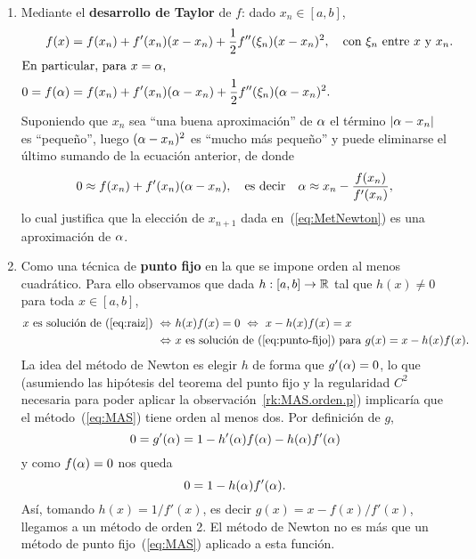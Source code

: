 \begin{enumerate}
\item Mediante el \textbf{desarrollo de Taylor} de $f$: dado $x_n\in [a,b]$,
  \begin{align*}
    f(x)&=f(x_n) + f'(x_n)(x-x_n) + \frac 12 f''(\xi_n)(x-x_n)^2, \quad
          \text{con $\xi_n$ entre $x$ y $x_n$}.
    \\
    \intertext{En particular, para $x=\alpha$,}
    0=f(\alpha)&=f(x_n) + f'(x_n)(\alpha-x_n) + \frac 12 f''(\xi_n)(\alpha-x_n)^2.
  \end{align*}
  Suponiendo que $x_n$ sea ``una buena aproximación'' de $\alpha$ el
  término $|\alpha-x_n|$ es ``pequeño'', luego $(\alpha-x_n)^2$ es
  ``mucho más pequeño'' y puede eliminarse el último sumando de la
  ecuación anterior, de donde
  \begin{equation*}
    0 \approx f(x_n) + f'(x_n)(\alpha-x_n), \quad \text{es decir} \quad
    \alpha \approx x_n - \frac{f(x_n)}{f'(x_n)},
  \end{equation*}
  lo cual justifica que la elección de $x_{n+1}$ dada
  en~(\ref{eq:MetNewton}) es una aproximación de $\alpha$.
\item Como una técnica de \textbf{punto fijo} en la que se impone
  orden al menos cuadrático. %
  Para ello observamos que dada $h:[a,b]\to\operatorname{{\mathbb R}}$ tal que $h(x)\neq 0$
  para toda $x\in[a,b]$,
  \begin{align*}
    x \text{ es solución de~(\ref{eq:raiz})} \ \Leftrightarrow\ & h(x)f(x)=0
                                                                  \ \Leftrightarrow\ x-h(x)f(x)=x \\
    \ \Leftrightarrow\ & x \text{ es solución de~(\ref{eq:punto-fijo}) para }
                         g(x)=x-h(x)f(x).
  \end{align*}
  La idea del método de Newton es elegir $h$ de forma que
  $g'(\alpha)=0$, lo que (asumiendo las hipótesis del teorema del punto
  fijo y la regularidad $C^2$ necesaria para poder aplicar la
  observación~\ref{rk:MAS.orden.p}) implicaría que el
  método~(\ref{eq:MAS}) tiene orden al menos dos. Por definición de
  $g$,
  $$
  0 = g'(\alpha) = 1-h'(\alpha)f(\alpha)-h(\alpha)f'(\alpha)
  $$
  y como $f(\alpha)=0$ nos queda
  $$
  0 = 1-h(\alpha)f'(\alpha).
  $$
  Así, tomando $h(x)=1/f'(x)$, es decir $g(x)=x-f(x)/f'(x)$, llegamos
  a un método de orden 2. El método de Newton no es más que un método
  de punto fijo~(\ref{eq:MAS}) aplicado a esta función.
\end{enumerate}

